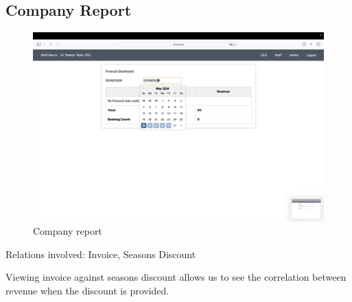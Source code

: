 \subsection{Company Report}
\begin{figure}[h]
	\centerline
	{\includegraphics[width=12cm]{fig/6_company}}
	\caption{Company report}
\end{figure} 

Relations involved: Invoice, Seasons Discount

Viewing invoice against seasons discount allows us to see the correlation between revenue when the discount is provided.

\clearpage
